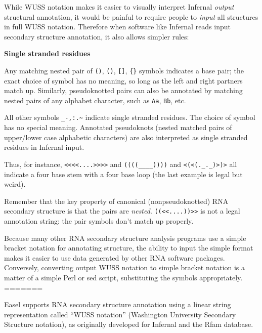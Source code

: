 While WUSS notation makes it easier to visually interpret Infernal
\emph{output} structural annotation, it would be painful to require
people to \emph{input} all structures in full WUSS notation. Therefore
when software like Infernal reads input secondary structure
annotation, it also allows simpler rules:

\begin{sreitems}{\textbf{Single stranded residues}}
\item [\textbf{Base pairs}]
  Any matching nested pair of \verb+()+, \verb+()+, \verb+[]+, \verb+{}+
  symbols indicates a base pair; the exact choice of symbol has no
  meaning, so long as the left and right partners match up.
  Similarly, pseudoknotted pairs can also be annotated by matching nested
  pairs of any alphabet character, such as \verb+Aa+, \verb+Bb+, etc.

\item [\textbf{Single stranded residues}]
  All other symbols \verb+_-,:.~+
  indicate single stranded residues.
  The choice of symbol has no special meaning.
  Annotated pseudoknots (nested matched pairs of upper/lower case
  alphabetic characters) are also interpreted as single
  stranded residues in Infernal input.
\end{sreitems}

Thus, for instance, \verb+<<<<....>>>>+ and \verb+((((____))))+ and
\verb+<(<(._._)>)>+ all indicate a four base stem with a four base
loop (the last example is legal but weird).

Remember that the key property of canonical (nonpseudoknotted) RNA
secondary structure is that the pairs are \emph{nested}.
\verb+((<<....))>>+ is not a legal annotation string: the pair symbols
don't match up properly. 

Because many other RNA secondary structure analysis programs use a
simple bracket notation for annotating structure, the ability to input
the simple format makes it easier to use data generated by other RNA
software packages. Conversely, converting output WUSS notation to
simple bracket notation is a matter of a simple Perl or sed script,
substituting the symbols appropriately.
=======

Easel supports RNA secondary structure annotation using a linear
string representation called ``WUSS notation'' (Washington University
Secondary Structure notation), as originally developed for Infernal
and the Rfam database.

